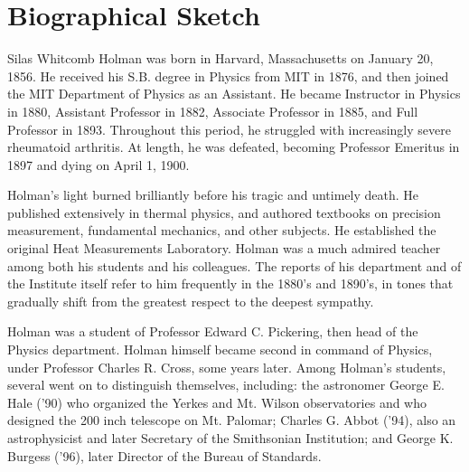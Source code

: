 

\chapter*{Biographical Sketch}


Silas Whitcomb Holman was born in Harvard, Massachusetts on January 20, 1856. He received his S.B. degree in Physics from MIT in 1876, and then joined the MIT Department of Physics as an Assistant. He became Instructor in Physics in 1880, Assistant Professor in 1882, Associate Professor in 1885, and Full Professor in 1893. Throughout this period, he struggled with increasingly severe rheumatoid arthritis. At length, he was defeated, becoming Professor Emeritus in 1897 and dying on April 1, 1900.

Holman's light burned brilliantly before his tragic and untimely death. He published extensively in thermal physics, and authored textbooks on precision measurement, fundamental mechanics, and other subjects. He established the original Heat Measurements Laboratory. Holman was a much admired teacher among both his students and his colleagues. The reports of his department and of the Institute itself refer to him frequently in the 1880's and 1890's, in tones that gradually shift from the greatest respect to the deepest sympathy.

Holman was a student of Professor Edward C. Pickering, then head of the Physics department. Holman himself became second in command of Physics, under Professor Charles R. Cross, some years later. Among Holman's students, several went on to distinguish themselves, including: the astronomer George E. Hale ('90) who organized the Yerkes and Mt. Wilson observatories and who designed the 200 inch telescope on Mt. Palomar; Charles G. Abbot ('94), also an astrophysicist and later Secretary of the Smithsonian Institution; and George K. Burgess ('96), later Director of the Bureau of Standards. 